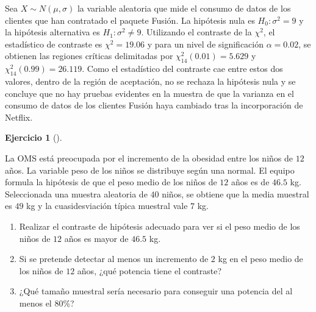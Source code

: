 \documentclass[
  spanish,
  a4paper,
]{scrreport}
\theoremstyle{definition}
\newtheorem{exercise}{Ejercicio}[chapter]
\theoremstyle{remark}
\begin{document}
\begin{tcolorbox}[enhanced jigsaw, arc=.35mm, bottomrule=.15mm, bottomtitle=1mm, breakable, colback=white, colbacktitle=quarto-callout-tip-color!10!white, colframe=quarto-callout-tip-color-frame, coltitle=black, left=2mm, leftrule=.75mm, opacityback=0, opacitybacktitle=0.6, rightrule=.15mm, title=\textcolor{quarto-callout-tip-color}{\faLightbulb}\hspace{0.5em}{Solución}, titlerule=0mm, toprule=.15mm, toptitle=1mm]

Sea \(X\sim N(\mu,\sigma)\) la variable aleatoria que mide el consumo de
datos de los clientes que han contratado el paquete Fusión. La hipótesis
nula es \(H_0: \sigma^2=9\) y la hipótesis alternativa es
\(H_1: \sigma^2\neq 9\). Utilizando el contraste de la \(\chi^2\), el
estadístico de contraste es \(\chi^2=19.06\) y para un nivel de
significación \(\alpha = 0.02\), se obtienen las regiones críticas
delimitadas por \(\chi^2_{14}(0.01) = 5.629\) y
\(\chi^2_{14}(0.99) = 26.119\). Como el estadístico del contraste cae
entre estos dos valores, dentro de la región de aceptación, no se
rechaza la hipótesis nula y se concluye que no hay pruebas evidentes en
la muestra de que la varianza en el consumo de datos de los clientes
Fusión haya cambiado tras la incorporación de Netflix.

\end{tcolorbox}

\begin{exercise}[]\protect\hypertarget{exr-contraste-media-peso}{}\label{exr-contraste-media-peso}

La OMS está preocupada por el incremento de la obesidad entre los niños
de \(12\) años. La variable peso de los niños se distribuye según una
normal. El equipo formula la hipótesis de que el peso medio de los niños
de \(12\) años es de \(46.5\) kg. Seleccionada una muestra aleatoria de
\(40\) niños, se obtiene que la media muestral es \(49\) kg y la
cuasidesviación típica muestral vale \(7\) kg.

\begin{enumerate}
\def\labelenumi{\alph{enumi}.}
\item
  Realizar el contraste de hipótesis adecuado para ver si el peso medio
  de los niños de \(12\) años es mayor de \(46.5\) kg.
\item
  Si se pretende detectar al menos un incremento de \(2\) kg en el peso
  medio de los niños de \(12\) años, ¿qué potencia tiene el contraste?
\item
  ¿Qué tamaño muestral sería necesario para conseguir una potencia del
  al menos el \(80\)\%?
\end{enumerate}

\end{exercise}
\end{document}
